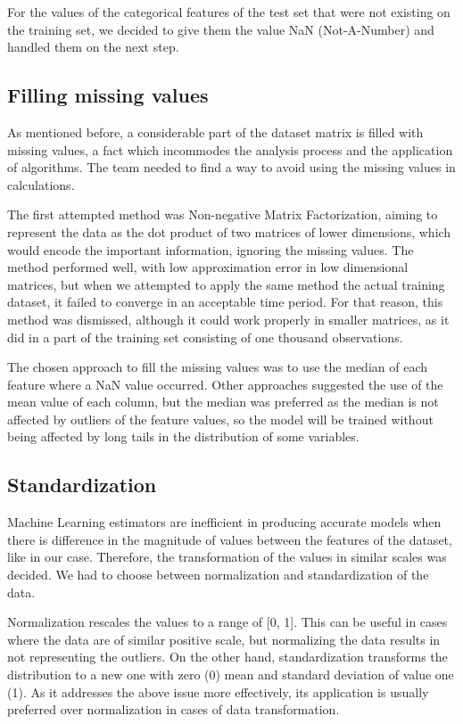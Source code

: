 \documentclass[conference, onecolumn]{IEEEtran}
\begin{document}
For the values of the categorical features of the test set that were not existing on the training set, we decided to give them the value NaN (Not-A-Number) and handled them on the next step.


\subsection{Filling missing values}
As mentioned before, a considerable part of the dataset matrix is filled with missing values, a fact which incommodes the analysis process and the application of algorithms. The team needed to find a way to avoid using the missing values in calculations.

The first attempted method was Non-negative Matrix Factorization, aiming to represent the data as the dot product of two matrices of lower dimensions, which would encode the important information, ignoring the missing values. The method performed well, with low approximation error in low dimensional matrices, but when we attempted to apply the same method the actual training dataset, it failed to converge in an acceptable time period. For that reason, this method was dismissed, although it could work properly in smaller matrices, as it did in a part of the training set consisting of one thousand observations.

The chosen approach to fill the missing values was to use the median of each feature where a NaN value occurred. Other approaches suggested the use of the mean value of each column, but the median was preferred as the median is not affected by outliers of the feature values, so the model will be trained without being affected by long tails in the distribution of some variables.

\subsection{Standardization}
Machine Learning estimators are inefficient in producing accurate models when there is difference in the magnitude of values between the features of the dataset, like in our case. Therefore, the transformation of the values in similar scales was decided. We had to choose between normalization and standardization of the data.

Normalization rescales the values to a range of [0, 1]. This can be useful in cases where the data are of similar positive scale, but normalizing the data results in not representing the outliers. On the other hand, standardization transforms the distribution to a new one with zero (0) mean and standard deviation of value one (1). As it addresses the above issue more effectively, its application is usually preferred over normalization in cases of data transformation.
\end{document}
